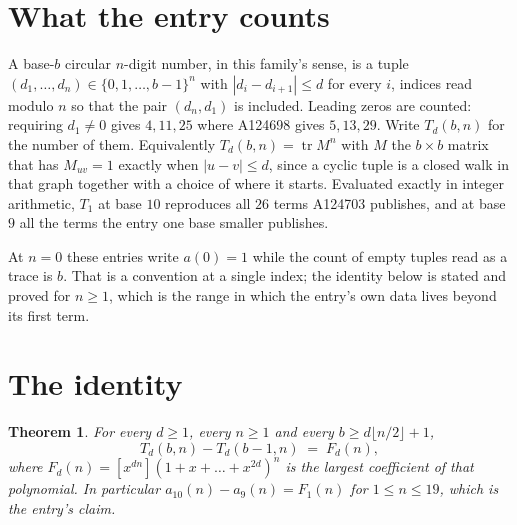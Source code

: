 \documentclass[11pt,a4paper]{article}
\theoremstyle{plain}
\newtheorem{theorem}{Theorem}
\theoremstyle{definition}
\begin{document}
\section{What the entry counts}

A base-$b$ circular $n$-digit number, in this family's sense, is a tuple
$(d_1,\dots,d_n)\in\{0,1,\dots,b-1\}^{n}$ with $|d_i-d_{i+1}|\le d$ for every $i$, indices
read modulo $n$ so that the pair $(d_n,d_1)$ is included. Leading zeros are counted: requiring
$d_1\ne0$ gives $4,11,25$ where A124698 gives $5,13,29$. Write $T_d(b,n)$ for the number of
them. Equivalently $T_d(b,n)=\operatorname{tr}M^{n}$ with $M$ the $b\times b$ matrix that has
$M_{uv}=1$ exactly when $|u-v|\le d$, since a cyclic tuple is a closed walk in that graph
together with a choice of where it starts. Evaluated exactly in integer arithmetic, $T_{1}$
at base $10$ reproduces all $26$ terms A124703 publishes, and at base $9$ all the
terms the entry one base smaller publishes.

At $n=0$ these entries write $a(0)=1$ while the count of empty tuples read as a trace is $b$.
That is a convention at a single index; the identity below is stated and proved for $n\ge1$,
which is the range in which the entry's own data lives beyond its first term.

\section{The identity}

\begin{theorem}
For every $d\ge1$, every $n\ge1$ and every $b\ge d\lfloor n/2\rfloor+1$,
\[
T_d(b,n)-T_d(b-1,n)\;=\;F_d(n),
\]
where $F_d(n)=[x^{dn}](1+x+\dots+x^{2d})^{n}$ is the largest coefficient of that
polynomial. In particular $a_{10}(n)-a_{9}(n)=F_{1}(n)$ for $1\le n\le19$, which
is the entry's claim.
\end{theorem}
\end{document}

